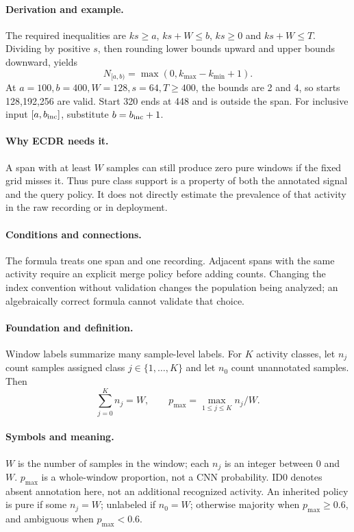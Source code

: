 \paragraph{Derivation and example.}
The required inequalities are $ks\ge a$, $ks+W\le b$, $ks\ge0$ and
$ks+W\le T$. Dividing by positive $s$, then rounding lower bounds upward
and upper bounds downward, yields
\[
 N_{[a,b)}=\max(0,k_{\max}-k_{\min}+1).
\]
At $a=100,b=400,W=128,s=64,T\ge400$, the bounds are 2 and 4, so starts
128,192,256 are valid. Start 320 ends at 448 and is outside the span.
For inclusive input $[a,b_{\rm inc}]$, substitute $b=b_{\rm inc}+1$.
\paragraph{Why ECDR needs it.}
A span with at least $W$ samples can still produce zero pure windows if
the fixed grid misses it. Thus pure class support is a property of both
the annotated signal and the query policy. It does not directly estimate
the prevalence of that activity in the raw recording or in deployment.
\paragraph{Conditions and connections.}
The formula treats one span and one recording. Adjacent spans with the
same activity require an explicit merge policy before adding counts.
Changing the index convention without validation changes the population
being analyzed; an algebraically correct formula cannot validate that choice.

\paragraph{Foundation and definition.}
Window labels summarize many sample-level labels. For $K$ activity classes,
let $n_j$ count samples assigned class $j\in\{1,\ldots,K\}$ and let $n_0$
count unannotated samples. Then
\[
 \sum_{j=0}^{K}n_j=W,\qquad
 p_{\max}=\max_{1\le j\le K}n_j/W.
\]
\paragraph{Symbols and meaning.}
$W$ is the number of samples in the window; each $n_j$ is an integer
between 0 and $W$. $p_{\max}$ is a whole-window proportion, not a CNN
probability. ID0 denotes absent annotation here, not an additional
recognized activity. An inherited policy is pure if some $n_j=W$;
unlabeled if $n_0=W$; otherwise majority when $p_{\max}\ge0.6$, and
ambiguous when $p_{\max}<0.6$.
